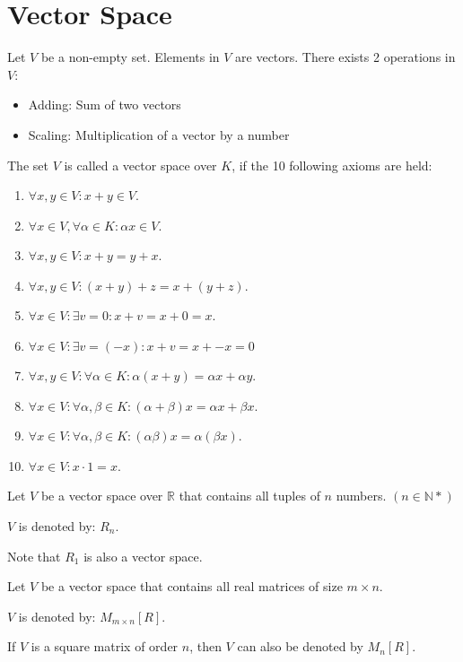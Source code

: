 \chapter{Vector Space}


    \par Let $V$ be a non-empty set. Elements in $V$ are vectors. There exists
    2 operations in $V$:
    \begin{itemize}
      \item Adding: Sum of two vectors
      \item Scaling: Multiplication of a vector by a number
    \end{itemize}

    \par The set $V$ is called a vector space over $K$, if the 10 following
    axioms are held:
    \begin{enumerate}
      \item $\forall x, y \in V: x + y \in V$.
      \item $\forall x \in V, \forall \alpha \in K: \alpha x \in V$.
      \item $\forall x, y \in V: x + y = y + x$.
      \item $\forall x, y \in V: (x + y) + z = x + (y + z)$.
      \item $\forall x \in V: \exists v = 0: x + v = x + 0 = x$.
      \item $\forall x \in V: \exists v = (-x): x + v = x + -x = 0$
      \item $\forall x, y \in V: \forall \alpha \in K:
        \alpha (x + y) = \alpha x + \alpha y$.
      \item $\forall x \in V: \forall \alpha, \beta \in K:
        (\alpha + \beta) x = \alpha x + \beta x$.
      \item $\forall x \in V: \forall \alpha, \beta \in K:
        (\alpha\beta) x = \alpha(\beta x)$.
      \item $\forall x \in V: x \cdot 1 = x$.
    \end{enumerate}

      \par Let $V$ be a vector space over $\mathbb{R}$ that contains all
        tuples of $n$ numbers. $(n \in \mathbb{N*})$
      \par $V$ is denoted by: $R_{n}$.
      \par Note that $R_{1}$ is also a vector space.

      \par Let $V$ be a vector space that contains all real matrices of size
      $m \times n$.
      \par $V$ is denoted by: $M_{m \times n}[R]$.
      \par If $V$ is a square matrix of order $n$, then $V$ can also be denoted
      by $M_{n}[R]$.

